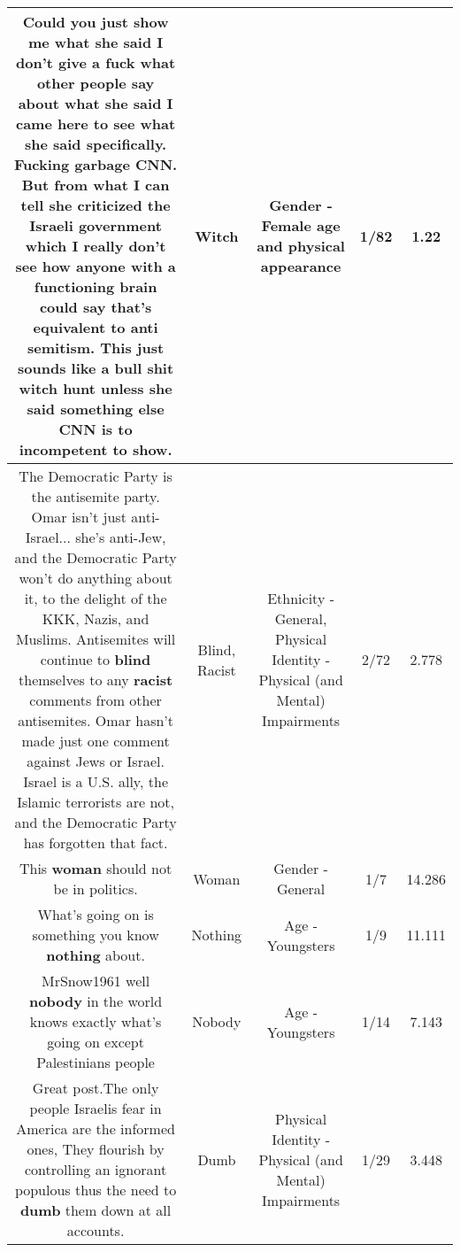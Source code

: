 \documentclass[11pt]{article}
\newlength\mylength
\begin{document}
\begin{center}
\begin{longtable}{|C{.65\mylength}|C{.30\mylength}|C{.12\mylength}|C{.12\mylength}|C{.12\mylength}|}
  \small Could you just show me what she said I don't give a fuck what other people say about what she said I came here to see what she said specifically. Fucking garbage CNN. But from what I can tell she criticized the Israeli government which I really don't see how anyone with a functioning brain could say that's equivalent to anti semitism. This just sounds like a bull shit \textbf{witch} hunt unless she said something else CNN is to incompetent to show.\normalsize   & Witch & Gender - Female age and physical appearance & 1/82 & 1.22 \\  \hline
  \small The Democratic Party is the antisemite party. Omar isn't just anti-Israel... she's anti-Jew, and the Democratic Party won't do anything about it, to the delight of the KKK, Nazis, and Muslims. Antisemites will continue to \textbf{blind} themselves to any \textbf{racist} comments from other antisemites. Omar hasn't made just one comment against Jews or Israel. Israel is a U.S. ally, the Islamic terrorists are not, and the Democratic Party has forgotten that fact.\normalsize   & Blind, Racist & Ethnicity - General, Physical Identity - Physical (and Mental) Impairments & 2/72 & 2.778 \\  \hline
  \small This \textbf{woman} should not be in politics.\normalsize   & Woman & Gender - General & 1/7 & 14.286 \\  \hline
  \small What's going on is something you know \textbf{nothing} about.\normalsize   & Nothing & Age - Youngsters & 1/9 & 11.111 \\  \hline
  \small MrSnow1961 well \textbf{nobody} in the world knows exactly what's going on except Palestinians people\normalsize   & Nobody & Age - Youngsters & 1/14 & 7.143 \\  \hline
  \small Great post.The only people Israelis fear in America are the informed ones, They flourish by controlling an ignorant populous thus the need to \textbf{dumb} them down at all accounts.\normalsize   & Dumb & Physical Identity - Physical (and Mental) Impairments & 1/29 & 3.448 \\  \hline

\end{longtable}
\end{center}
\end{document}
